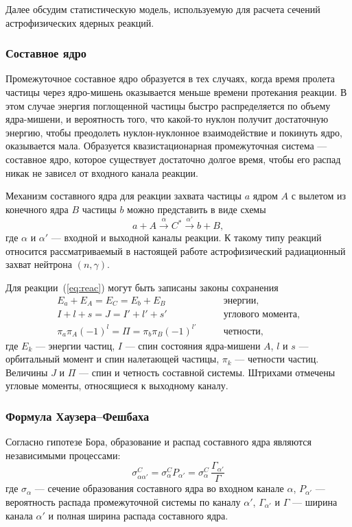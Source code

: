 Далее обсудим статистическую модель, используемую для расчета сечений астрофизических ядерных реакций.

\subsubsection{Составное ядро}
Промежуточное составное ядро образуется в тех случаях, когда время пролета частицы через ядро-мишень оказывается меньше времени протекания реакции. В этом случае энергия поглощенной частицы быстро распределяется по объему ядра-мишени, и вероятность того, что какой-то нуклон получит достаточную энергию, чтобы преодолеть нуклон-нуклонное взаимодействие и покинуть ядро, оказывается мала. Образуется квазистационарная промежуточная система --- составное ядро, которое существует достаточно долгое время, чтобы его распад никак не зависел от входного канала реакции.

Механизм составного ядра для реакции захвата частицы $a$ ядром $A$ с вылетом из конечного ядра $B$ частицы $b$ можно представить в виде схемы
\begin{equation}
a + A \xrightarrow{\alpha} C^* \xrightarrow{\alpha'} b + B,
\label{eq:reac}
\end{equation}
где $\alpha$ и $\alpha'$ --- входной и выходной каналы реакции. К такому типу реакций относится рассматриваемый в настоящей работе астрофизический радиационный захват нейтрона $(n,\gamma)$. 

Для реакции~(\ref{eq:reac}) могут быть записаны законы сохранения
\begin{equation}
\begin{aligned}
E_a + E_A = E_C = E_b + E_B& \qquad \text{энергии,}\\
I + l + s = J = I' + l' + s'& \qquad \text{углового момента,}\\
\pi_a \pi_A (-1)^l = \Pi = \pi_b \pi_B (-1)^{l'}& \qquad \text{четности,}
\end{aligned}
\end{equation}
где $E_k$ --- энергии частиц, $I$ --- спин состояния ядра-мишени $A$, $l$ и $s$ --- орбитальный момент и спин налетающей частицы, $\pi_k$ --- четности частиц. Величины $J$ и $\Pi$ --- спин и четность составной системы. Штрихами отмечены угловые моменты, относящиеся к выходному каналу.

\subsubsection{Формула Хаузера--Фешбаха}
Согласно гипотезе Бора, образование и распад составного ядра являются независимыми процессами:
\begin{equation}
\displaystyle
\sigma^C_{\alpha \alpha'} = \sigma^C_{\alpha}P_{\alpha'} = 
\sigma^C_{\alpha} \, \frac{\Gamma_{\alpha'}}{\Gamma}
\end{equation}
где $\sigma_{\alpha}$ --- сечение образования составного ядра во входном канале $\alpha$, $P_{\alpha'}$ --- вероятность распада промежуточной системы по каналу $\alpha'$, $\Gamma_{\alpha'}$ и $\Gamma$ --- ширина канала $\alpha'$ и полная ширина распада составного ядра.

